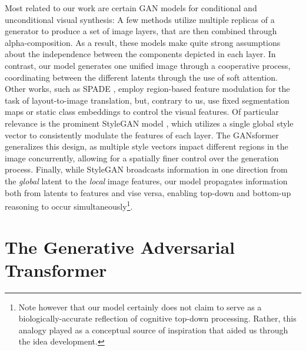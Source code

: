 \documentclass{article}
\begin{document}
Most related to our work are certain GAN models for conditional and unconditional visual synthesis: A few methods \citep{kgan,mganprior,blockgan,relate} utilize multiple replicas of a generator to produce a set of image layers, that are then combined through alpha-composition. As a result, these models make quite strong assumptions about the independence between the components depicted in each layer. In contrast, our model generates one unified image through a cooperative process, coordinating between the different latents through the use of soft attention. Other works, such as SPADE \citep{spade,sean}, employ region-based feature modulation for the task of layout-to-image translation, but, contrary to us, use fixed segmentation maps or static class embeddings to control the visual features. Of particular relevance is the prominent StyleGAN model \citep{stylegan,stylegan2}, which utilizes a single global style vector to consistently modulate the features of each layer. The GANsformer generalizes this design, as multiple style vectors impact different regions in the image concurrently, allowing for a spatially finer control over the generation process. Finally, while StyleGAN broadcasts information in one direction from the \textit{global} latent to the \textit{local} image features, our model propagates information both from latents to features and vise versa, enabling top-down and bottom-up reasoning to occur simultaneously\footnote{Note however that our model certainly does not claim to serve as a biologically-accurate reflection of cognitive top-down processing. Rather, this analogy played as a conceptual source of inspiration that aided us through the idea development.}. \section{The Generative Adversarial Transformer}
\label{model}
\end{document}
